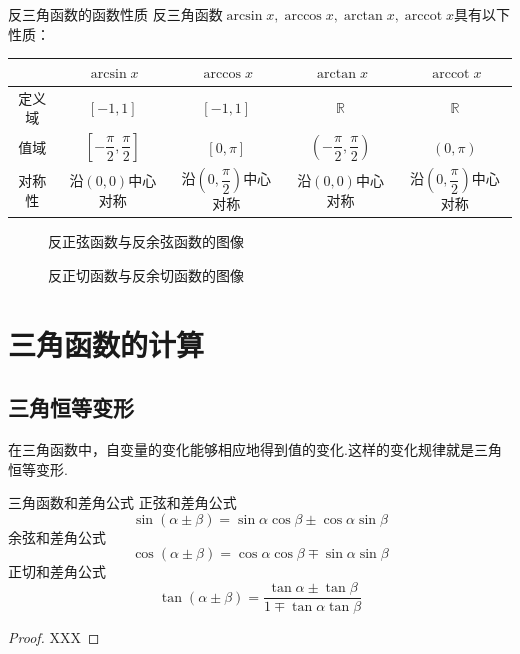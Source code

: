 \documentclass[lang=cn, zihao=5]{elegantbook}
\DeclareMathOperator{\arccot}{arccot}
\begin{document}
\begin{proposition}{反三角函数的函数性质}
    反三角函数$\arcsin{x},\arccos{x},\arctan{x},\arccot{x}$具有以下性质：

    \vspace{1em}
    \centering
    \renewcommand\arraystretch{1.2}
    \begin{tabular}{c|c|c|c|c}
        \hline
          & $\arcsin{x}$ & $\arccos{x}$ & $\arctan{x}$ & $\arccot{x}$ \\ \hline
        定义域 & $[-1,1]$ & $[-1,1]$ & $\mathbb{R}$ & $\mathbb{R}$ \\ \hline
        值域 & $[-\dfrac{\pi}{2} ,\dfrac{\pi}{2}]$ & $[0,\pi]$ & $(-\dfrac{\pi}{2},\dfrac{\pi}{2})$ & $(0,\pi)$ \\ \hline
        对称性 & 沿$(0,0)$中心对称 & 沿$(0,\dfrac{\pi}{2})$中心对称 & 沿$(0,0)$中心对称 & 沿$(0,\dfrac{\pi}{2})$中心对称 \\ \hline
    \end{tabular}
    
\end{proposition}

\begin{figure}[h!]
	\centering
	
	\caption{反正弦函数与反余弦函数的图像}
\end{figure}

\begin{figure}[h!]
	\centering
	
	\caption{反正切函数与反余切函数的图像}
\end{figure}

\section{三角函数的计算}

\subsection{三角恒等变形}

在三角函数中，自变量的变化能够相应地得到值的变化.这样的变化规律就是三角恒等变形.

\begin{theorem}{三角函数和差角公式} %
    正弦和差角公式$$\sin{(\alpha \pm \beta)}=\sin{\alpha}\cos{\beta} \pm \cos{\alpha}\sin{\beta}$$
    余弦和差角公式$$\cos{(\alpha \pm \beta)}=\cos{\alpha}\cos{\beta} \mp \sin{\alpha}\sin{\beta}$$
    正切和差角公式$$\tan{(\alpha \pm \beta)}=\frac{\tan{\alpha} \pm \tan{\beta}}{1 \mp \tan{\alpha}\tan{\beta}}$$
\end{theorem}
\begin{proof}
    XXX
\end{proof}
\end{document}
